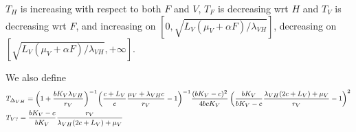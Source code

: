 \documentclass{article}
\newcommand{\lv}{\lambda_{VH}}
\begin{document}
$T_H$ is increasing with respect to both $F$ and $V$, $T_F$ is decreasing wrt $H$ and $T_V$ is decreasing wrt $F$, and increasing on $[0, \sqrt{L_V (\mu_V + \alpha F) /\lv}]$, decreasing on $[\sqrt{L_V (\mu_V + \alpha F) /\lv}, +\infty]$.

We also define
\begin{subequations}
{\footnotesize
\begin{align}
&  T_{\Delta_{VH}} = \Big(1 + \dfrac{b K_V \lv}{r_V}\Big)^{-1}\Big(\dfrac{c+L_V}{c} \dfrac{\mu_V + \lv c}{r_V} - 1\Big)^{-1} \dfrac{(bK_V - c)^2}{4bcK_V}\left( \dfrac{bK_V}{bK_V - c}\dfrac{\lv(2c+L_V) + \mu_V}{r_V} - 1 \right)^2  \\
& T_{V?} = \dfrac{bK_V - c}{bK_V}\dfrac{r_V}{\lv  (2c+L_V) + \mu_V} 
\end{align}
}
\end{subequations}
\end{document}
